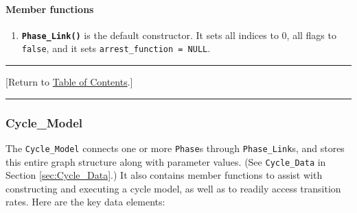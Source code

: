 \documentclass[12pt]{article}
\renewcommand{\v}{\verb}
\newcommand{\smallcode}[1]{\textbf{\texttt{#1}}}
\newcommand{\blue}[1]{\textcolor{blue}{#1}}
\newcommand{\DONE}{}%
\newcommand{\TOClink}{\begin{center}\hrule\vskip-5pt\phantom{.}\hfill[Return to \hyperlink{TOC}{Table of Contents}.]\hfill\phantom{.}\vskip3pt\hrule\end{center}}
\begin{document}
\paragraph{Member functions}
\begin{enumerate}
\item
\smallcode{Phase\_Link()} is the default constructor. It sets all indices to 0, 
all flags to \v|false|, and it sets \hfill\break \v|arrest_function = NULL|. 
\end{enumerate}

\TOClink 

\subsubsection{Cycle\_Model \DONE}
\label{sec:Cycle_Model}
The \v|Cycle_Model| connects one or more \v|Phase|s through 
\v|Phase_Link|s, and stores this entire graph structure along with 
parameter values. (See \v|Cycle_Data| in 
Section \ref{sec:Cycle_Data}.) 
It also contains member functions to assist with constructing and executing 
a cycle model, as well as to readily access transition rates. 
Here are the key  data elements: 
\end{document}
